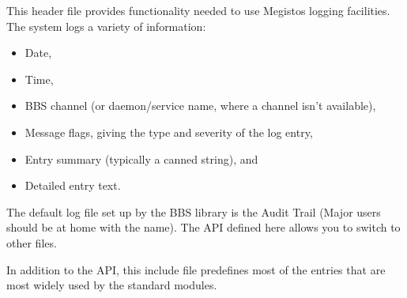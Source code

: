 \documentclass{article}
\begin{document}
\begin{cxxContents}
\end{cxxContents}
\clearpage\pagebreak
\begin{cxxdoc}

This header file provides functionality needed to use Megistos logging
facilities. The system logs a variety of information:

\begin{itemize}

\item	 Date,
\item	 Time,
\item	 BBS channel (or daemon/service name, where a channel isn't available),
\item	 Message flags, giving the type and severity of the log entry,
\item	 Entry summary (typically a canned string), and
\item	 Detailed entry text.
\end{itemize}


The default log file set up by the BBS library is the Audit Trail (Major
users should be at home with the name). The API defined here allows you to
switch to other files.

In addition to the API, this include file predefines most of the entries
that are most widely used by the standard modules.

\end{cxxdoc}
\end{document}

